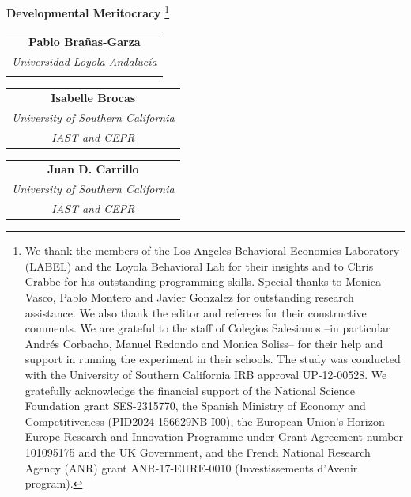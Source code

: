 \documentclass[11pt]{article}
\begin{document}
 \baselineskip=14pt

 
\thispagestyle{empty} \renewcommand{\thefootnote}{\fnsymbol{footnote}}


\centerline{\Large {\bf Developmental Meritocracy}  \footnote{We thank the members of the Los Angeles Behavioral Economics Laboratory (LABEL) and the Loyola Behavioral Lab for their insights and to Chris Crabbe for his outstanding programming skills. Special thanks to Monica Vasco, Pablo Montero  and Javier Gonzalez for outstanding research assistance. We also thank the editor and referees for their constructive comments. We are grateful to the staff of Colegios Salesianos --in particular Andr\'es Corbacho, Manuel Redondo and Monica Soliss-- for their help and support in running the experiment in their schools. The study was conducted with the University of Southern California IRB approval UP-12-00528. We gratefully acknowledge the financial support of the National Science Foundation grant SES-2315770, the Spanish Ministry of Economy and Competitiveness (PID2024-156629NB-I00), the European Union's Horizon Europe Research and Innovation Programme under Grant Agreement number 101095175 and the UK Government, and the French National Research Agency (ANR) grant ANR-17-EURE-0010 (Investissements d’Avenir program).
}}

\vspace*{7mm}

\noindent

\begin{tabular}{c}
\textbf{Pablo Bra\~nas-Garza} \\
\textit{Universidad Loyola Andaluc\'{i}a} \\
\textit{ }%
\end{tabular}
\hfill
\begin{tabular}{c}
\textbf{Isabelle Brocas} \\
\textit{University of Southern California} \\
\textit{IAST and CEPR}%
\end{tabular}\par  
\begin{center}
\begin{tabular}{c}
\textbf{Juan D. Carrillo} \\
\textit{University of Southern California} \\
\textit{IAST and CEPR}%
\end{tabular}
\end{center} \par \vspace*{3mm}
 
\end{document}
